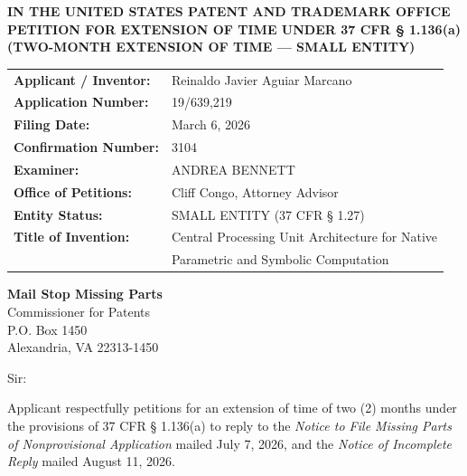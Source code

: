 \documentclass[11pt,letterpaper]{article}
\begin{document}
\thispagestyle{empty}

\begin{center}
    \textbf{\large IN THE UNITED STATES PATENT AND TRADEMARK OFFICE} \\
    \vspace{0.3cm}
    \textbf{\large PETITION FOR EXTENSION OF TIME UNDER 37 CFR \S{} 1.136(a)} \\
    \textbf{\normalsize (TWO-MONTH EXTENSION OF TIME --- SMALL ENTITY)}
\end{center}

\vspace{0.4cm}
\noindent\begin{tabular}{p{2.3in}p{4.0in}}
\textbf{Applicant / Inventor:} & Reinaldo Javier Aguiar Marcano \\
\textbf{Application Number:} & 19/639,219 \\
\textbf{Filing Date:} & March 6, 2026 \\
\textbf{Confirmation Number:} & 3104 \\
\textbf{Examiner:} & ANDREA BENNETT \\
\textbf{Office of Petitions:} & Cliff Congo, Attorney Advisor \\
\textbf{Entity Status:} & SMALL ENTITY (37 CFR \S{} 1.27) \\
\textbf{Title of Invention:} & Central Processing Unit Architecture for Native \\
& Parametric and Symbolic Computation \\
\end{tabular}

\vspace{0.5cm}
\noindent\textbf{Mail Stop Missing Parts} \\
Commissioner for Patents \\
P.O. Box 1450 \\
Alexandria, VA 22313-1450

\vspace{0.2cm}
Sir:

Applicant respectfully petitions for an extension of time of two (2) months under the provisions of 37 CFR \S{} 1.136(a) to reply to the \textit{Notice to File Missing Parts of Nonprovisional Application} mailed July 7, 2026, and the \textit{Notice of Incomplete Reply} mailed August 11, 2026.
\end{document}
